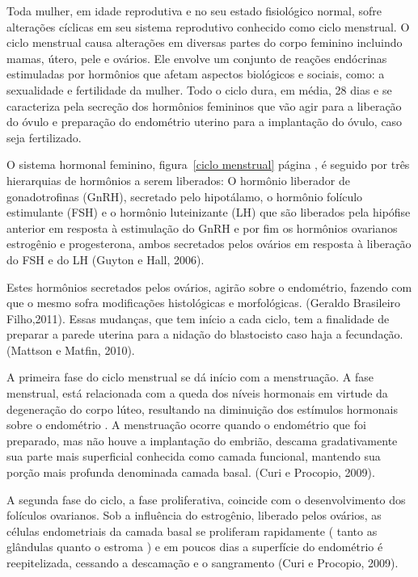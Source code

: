 \documentclass[12pt]{article} %
\begin{document}
Toda mulher, em idade reprodutiva e no seu estado fisiológico normal, sofre alterações cíclicas em
seu sistema reprodutivo conhecido como ciclo menstrual. O ciclo
menstrual causa alterações em diversas partes do corpo feminino
incluindo mamas, útero, pele e ovários. Ele envolve um conjunto de
reações endócrinas estimuladas por hormônios que afetam aspectos biológicos e
sociais, como: a sexualidade e fertilidade da
mulher. Todo o ciclo dura, em média, 28 dias e se caracteriza pela
secreção dos hormônios femininos que vão agir para a liberação do
óvulo e preparação do endométrio uterino para a implantação do óvulo, 
caso seja fertilizado.

O sistema hormonal feminino, figura~\ref{ciclo menstrual} página
\pageref{ciclo menstrual}, é seguido por três hierarquias de hormônios
a serem liberados: O hormônio liberador de gonadotrofinas (GnRH),
secretado pelo hipotálamo, o hormônio folículo estimulante (FSH) e o
hormônio luteinizante (LH) que são liberados pela hipófise anterior
em resposta à estimulação do GnRH e por fim os hormônios ovarianos
estrogênio e progesterona, ambos secretados pelos ovários em resposta
à liberação do FSH e do LH (Guyton e Hall, 2006).


Estes hormônios secretados pelos ovários, agirão sobre o endométrio, 
fazendo com que o mesmo sofra modificações histológicas e morfológicas.
(Geraldo Brasileiro Filho,2011). 
Essas mudanças, que tem início a cada ciclo, tem a finalidade
de preparar a parede uterina para a nidação do blastocisto caso haja a
fecundação. (Mattson e Matfin, 2010).


A primeira fase do ciclo menstrual se dá início com a menstruação. A fase menstrual, está relacionada com a queda dos níveis hormonais
em virtude da degeneração do corpo lúteo, resultando na diminuição dos estímulos hormonais sobre o endométrio . A menstruação ocorre quando o endométrio que foi preparado, mas não houve a implantação do embrião, descama gradativamente sua parte mais superficial conhecida como camada funcional,  mantendo sua porção  mais profunda denominada 
camada basal. (Curi e Procopio, 2009).

A segunda fase do ciclo, a fase proliferativa, coincide com o desenvolvimento dos folículos
ovarianos. Sob a influência do estrogênio,
liberado pelos ovários, as células endometriais da camada
basal se proliferam rapidamente ( tanto as glândulas quanto o estroma ) e
em poucos dias a superfície do endométrio é reepitelizada, cessando a
descamação e o sangramento (Curi e Procopio, 2009).
\end{document}
